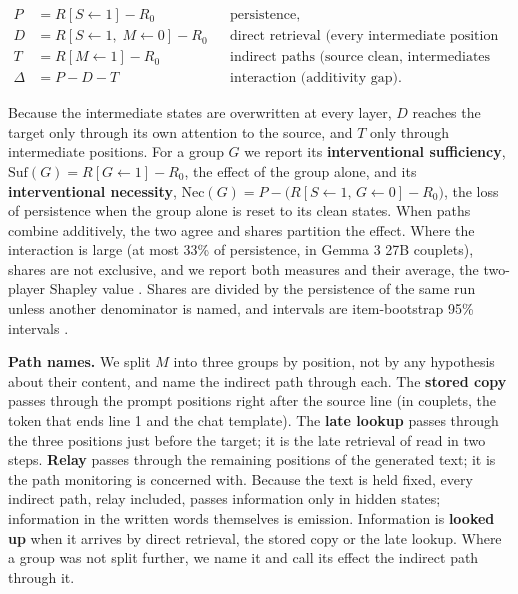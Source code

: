\documentclass[
]{article}
\begin{document}
\[
\begin{aligned}
P &= R[S\!\leftarrow\!1] - R_0 &&\text{persistence,}\\
D &= R[S\!\leftarrow\!1,\;M\!\leftarrow\!0] - R_0 &&\text{direct retrieval (every intermediate position clean),}\\
T &= R[M\!\leftarrow\!1] - R_0 &&\text{indirect paths (source clean, intermediates as in the edited run),}\\
\Delta &= P - D - T &&\text{interaction (additivity gap).}
\end{aligned}
\]

Because the intermediate states are overwritten at every layer, \(D\)
reaches the target only through its own attention to the source, and
\(T\) only through intermediate positions. For a group \(G\) we report
its \textbf{interventional sufficiency},
\(\mathrm{Suf}(G)=R[G\!\leftarrow\!1]-R_0\), the effect of the group
alone, and its \textbf{interventional necessity},
\(\mathrm{Nec}(G)=P-\big(R[S\!\leftarrow\!1,\,G\!\leftarrow\!0]-R_0\big)\),
the loss of persistence when the group alone is reset to its clean
states. When paths combine additively, the two agree and shares
partition the effect. Where the interaction is large (at most 33\% of
persistence, in Gemma 3 27B couplets), shares are not exclusive, and we
report both measures and their average, the two-player Shapley value
\citep{shapley1953}. Shares are divided by the persistence of the same
run unless another denominator is named, and intervals are
item-bootstrap 95\% intervals \citep{efron1994bootstrap}.

\textbf{Path names.} We split \(M\) into three groups by position, not
by any hypothesis about their content, and name the indirect path
through each. The \textbf{stored copy} passes through the prompt
positions right after the source line (in couplets, the token that ends
line 1 and the chat template). The \textbf{late lookup} passes through
the three positions just before the target; it is the late retrieval of
\citet{hanna2026latent} read in two steps. \textbf{Relay} passes through
the remaining positions of the generated text; it is the path monitoring
is concerned with. Because the text is held fixed, every indirect path,
relay included, passes information only in hidden states; information in
the written words themselves is emission. Information is \textbf{looked
up} when it arrives by direct retrieval, the stored copy or the late
lookup. Where a group was not split further, we name it and call its
effect the indirect path through it.
\end{document}
